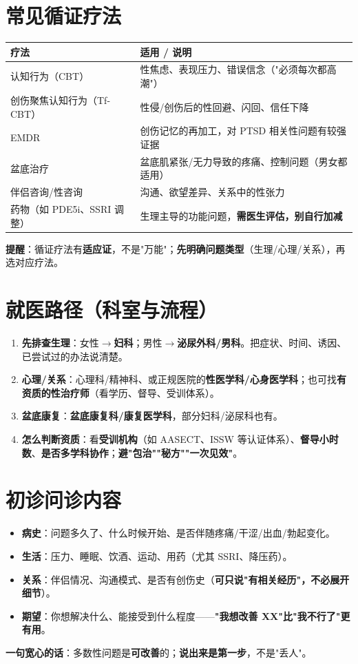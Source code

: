 \documentclass[12pt,UTF8,openany]{ctexbook}
\begin{document}
\section{常见循证疗法}
\begin{tabularx}{\textwidth}{X X}
\toprule
\textbf{疗法} & \textbf{适用 / 说明} \\
\midrule
认知行为（CBT） & 性焦虑、表现压力、错误信念（"必须每次都高潮"） \\
创伤聚焦认知行为（Tf-CBT） & 性侵/创伤后的性回避、闪回、信任下降 \\
EMDR & 创伤记忆的再加工，对 PTSD 相关性问题有较强证据 \\
盆底治疗 & 盆底肌紧张/无力导致的疼痛、控制问题（男女都适用） \\
伴侣咨询/性咨询 & 沟通、欲望差异、关系中的性张力 \\
药物（如 PDE5i、SSRI 调整） & 生理主导的功能问题，\textbf{需医生评估，别自行加减} \\
\bottomrule
\end{tabularx}
\par\smallskip
\textbf{提醒}：循证疗法有\textbf{适应证}，不是"万能"；\textbf{先明确问题类型}（生理/心理/关系），再选对应疗法。

\section{就医路径（科室与流程）}
\begin{enumerate}[leftmargin=2em,itemsep=0.3em]
  \item \textbf{先排查生理}：女性$\to$\textbf{妇科}；男性$\to$\textbf{泌尿外科/男科}。把症状、时间、诱因、已尝试过的办法说清楚。
  \item \textbf{心理/关系}：心理科/精神科、或正规医院的\textbf{性医学科/心身医学科}；也可找\textbf{有资质的性治疗师}（看学历、督导、受训体系）。
  \item \textbf{盆底康复}：\textbf{盆底康复科/康复医学科}，部分妇科/泌尿科也有。
  \item \textbf{怎么判断资质}：看\textbf{受训机构}（如 AASECT、ISSW 等认证体系）、\textbf{督导小时数}、\textbf{是否多学科协作}；\textbf{避"包治""秘方""一次见效"}。
\end{enumerate}

\section{初诊问诊内容}
\begin{itemize}[leftmargin=2em,itemsep=0.3em]
  \item \textbf{病史}：问题多久了、什么时候开始、是否伴随疼痛/干涩/出血/勃起变化。
  \item \textbf{生活}：压力、睡眠、饮酒、运动、用药（尤其 SSRI、降压药）。
  \item \textbf{关系}：伴侣情况、沟通模式、是否有创伤史（\textbf{可只说"有相关经历"，不必展开细节}）。
  \item \textbf{期望}：你想解决什么、能接受到什么程度——\textbf{"我想改善 XX"比"我不行了"更有用}。
\end{itemize}
\textbf{一句宽心的话}：多数性问题是\textbf{可改善}的；\textbf{说出来是第一步}，不是"丢人"。
\end{document}
